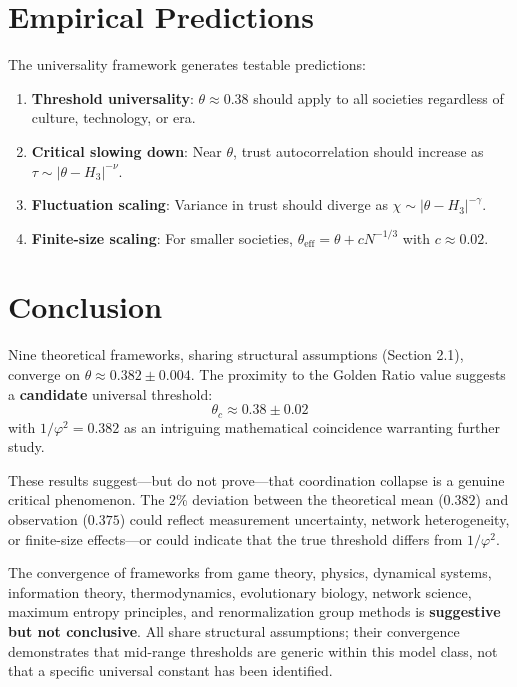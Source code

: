 \documentclass[11pt,twocolumn]{article}
\begin{document}
\section{Empirical Predictions}

The universality framework generates testable predictions:

\begin{enumerate}
\item \textbf{Threshold universality}: $\theta \approx 0.38$ should apply to all societies regardless of culture, technology, or era.

\item \textbf{Critical slowing down}: Near $\theta$, trust autocorrelation should increase as $\tau \sim |\theta - H_3|^{-\nu}$.

\item \textbf{Fluctuation scaling}: Variance in trust should diverge as $\chi \sim |\theta - H_3|^{-\gamma}$.

\item \textbf{Finite-size scaling}: For smaller societies, $\theta_{\text{eff}} = \theta + cN^{-1/3}$ with $c \approx 0.02$.
\end{enumerate}

\section{Conclusion}

Nine theoretical frameworks, sharing structural assumptions (Section 2.1), converge on $\theta \approx 0.382 \pm 0.004$. The proximity to the Golden Ratio value suggests a \textbf{candidate} universal threshold:
\begin{equation}
\boxed{\theta_c \approx 0.38 \pm 0.02}
\end{equation}
with $1/\varphi^2 = 0.382$ as an intriguing mathematical coincidence warranting further study.

These results suggest---but do not prove---that coordination collapse is a genuine critical phenomenon. The 2\% deviation between the theoretical mean ($0.382$) and observation ($0.375$) could reflect measurement uncertainty, network heterogeneity, or finite-size effects---or could indicate that the true threshold differs from $1/\varphi^2$.

The convergence of frameworks from game theory, physics, dynamical systems, information theory, thermodynamics, evolutionary biology, network science, maximum entropy principles, and renormalization group methods is \textbf{suggestive but not conclusive}. All share structural assumptions; their convergence demonstrates that mid-range thresholds are generic within this model class, not that a specific universal constant has been identified.
\end{document}
